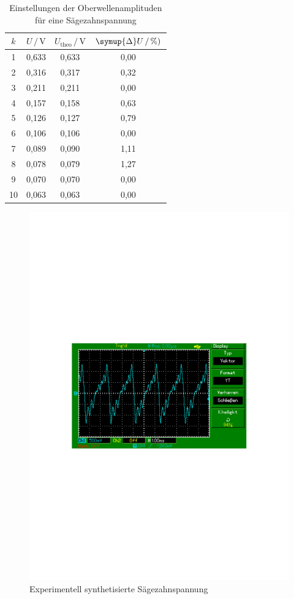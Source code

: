 \begin{table}
    \centering
    \caption{Einstellungen der Oberwellenamplituden für eine Sägezahnspannung}
    \label{tab:Messdaten4}
    \begin{tabular}{c c c c}
    \toprule
    $k$ & $U \,/\, \si{\volt}$ & $U_\text{theo} \,/\, \si{\volt}$ & $\symup{\Delta}U \,/\, \si{\percent})$ \\
    \midrule
    1 & 0,633 & 0,633 & 0,00 \\
    2 & 0,316 & 0,317 & 0,32 \\
    3 & 0,211 & 0,211 & 0,00 \\
    4 & 0,157 & 0,158 & 0,63 \\
    5 & 0,126 & 0,127 & 0,79 \\
    6 & 0,106 & 0,106 & 0,00 \\
    7 & 0,089 & 0,090 & 1,11 \\
    8 & 0,078 & 0,079 & 1,27 \\
    9 & 0,070 & 0,070 & 0,00 \\
   10 & 0,063 & 0,063 & 0,00 \\
    \bottomrule
    \end{tabular}
\end{table}

\begin{figure}
    \includegraphics[scale = 0.7]{content/MAP001.pdf}
    \caption{Experimentell synthetisierte Sägezahnspannung}
    \label{fig:Ex1}
\end{figure}



